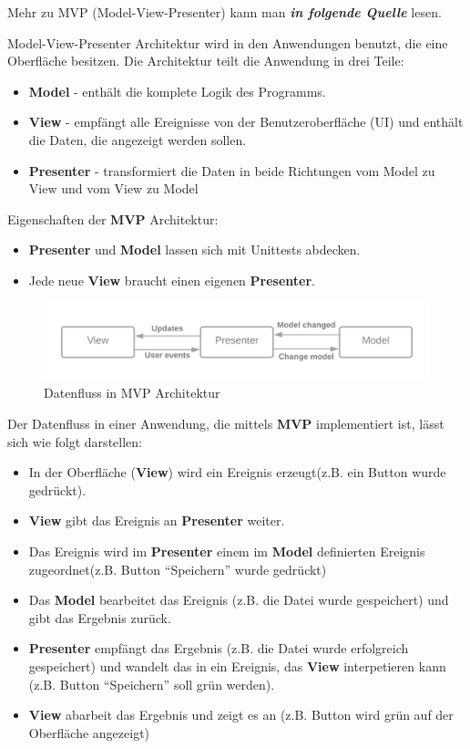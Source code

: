 Mehr zu MVP (Model-View-Presenter) kann man \textit{\textbf{in folgende Quelle}} lesen.

Model-View-Presenter Architektur wird in den Anwendungen benutzt, die eine Oberfläche besitzen.
Die Architektur teilt die Anwendung in drei Teile:
\begin{itemize}
    \item \textbf{Model} - enthält die komplete Logik des Programms.
    \item \textbf{View} - empfängt alle Ereignisse von der Benutzeroberfläche (UI) und enthält die Daten, die angezeigt werden sollen.
    \item \textbf{Presenter} - transformiert die Daten in beide Richtungen vom Model zu View 
    und vom View zu Model
\end{itemize}


Eigenschaften der \textbf{MVP} Architektur:
\begin{itemize}
    \item \textbf{Presenter} und \textbf{Model} lassen sich mit Unittests abdecken.
    \item Jede neue \textbf{View} braucht einen eigenen \textbf{Presenter}.
\end{itemize}

\begin{figure}[H]
    \centering
    \includegraphics[width=1\textwidth]{./images/MVP.png}
    \caption[Datenfluss in MVP Architektur]{Datenfluss in MVP Architektur}
    \label{fig:MVP}
\end{figure}

Der Datenfluss in einer Anwendung, die mittels \textbf{MVP} implementiert ist, lässt sich wie folgt darstellen:
\begin{itemize}
    \item In der Oberfläche (\textbf{View}) wird ein Ereignis erzeugt(z.B. ein Button wurde gedrückt).
    \item \textbf{View} gibt das Ereignis an \textbf{Presenter} weiter.
    \item Das Ereignis wird im \textbf{Presenter} einem im \textbf{Model} definierten Ereignis zugeordnet(z.B. Button ``Speichern'' wurde gedrückt)
    \item Das \textbf{Model} bearbeitet das Ereignis (z.B. die Datei wurde gespeichert) und gibt das Ergebnis zurück.
    \item \textbf{Presenter} empfängt das Ergebnis (z.B. die Datei wurde erfolgreich gespeichert) und wandelt das in ein Ereignis,
    das \textbf{View} interpetieren kann (z.B. Button ``Speichern'' soll grün werden).
    \item \textbf{View} abarbeit das Ergebnis und zeigt es an (z.B. Button wird grün auf der Oberfläche angezeigt)
\end{itemize}